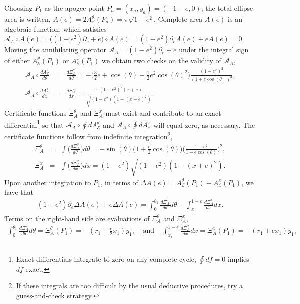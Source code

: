 \documentclass[nofootinbib,preprint]{revtex4-1}
\begin{document}
Choosing $P_1$ as the apogee point $P_a=(x_a,y_a)=(-1-e,0)$, the total ellipse area is written,
$A(e)=2A_{\mathcal{E}}^{\theta}(P_a)=\pi\sqrt{1-e^2}$. Complete area $A(e)$ is an algebraic function, which
 satisfies ${\mathcal{A}_A\circ A(e) =  \big((1-e^2)\partial_e + e\big)\circ A(e) = (1-e^2)\partial_e A(e) + e A(e)=0}$.
 Moving the  annihilating operator $\mathcal{A}_A =  (1-e^2)\partial_e + e$ under the integral sign of either 
$A_{\mathcal{E}}^{\theta}(P_1)$ or $A_{\mathcal{E}}^{x}(P_1)$ we obtain two checks on 
the validity of $\mathcal{A}_A$, 
\begin{eqnarray}
\mathcal{A}_A\circ \frac{dA_{\mathcal{E}}^{\theta}}{d\theta} &=&  \frac{d\Xi_{A}^{\theta}}{d\theta}
 = -\Big(\tfrac{3}{2}e+\cos(\theta)+\tfrac{1}{2}e^2\cos(\theta)^2\Big)\frac{(1-e^2)^2}{(1+e \cos(\theta))^3}, \nonumber \\
\mathcal{A}_A\circ \frac{dA_{\mathcal{E}}^{x}}{dx}   &=& \frac{d\Xi_{A}^{x}}{dx}
= \frac{-(1-e^2)^2(x+e)}{\sqrt{(1-e^2)(1-(x+e)^2)}} .\nonumber 
\end{eqnarray}
Certificate functions $\Xi_{A}^{\theta}$ and $\Xi_{A}^{x}$  must exist and contribute 
to an exact differential\footnote{Exact differentials integrate to zero on any complete cycle, 
$\oint df = 0$ implies $df$ exact.} so that $\mathcal{A}_A\circ \oint dA_{\mathcal{E}}^{\theta}$ 
and $\mathcal{A}_A\circ \oint dA_{\mathcal{E}}^{x}$ will equal zero, as necessary. The 
certificate functions follow from indefinite integration\footnote{If these integrals are too difficult
by the usual deductive procedures, try a guess-and-check strategy.},
\begin{eqnarray}
\Xi^{\theta}_A &=& \int \Big(\frac{d\Xi^{\theta}_A}{d\theta}\Big)d\theta
= -\sin(\theta)\big(1+\tfrac{e}{2}\cos(\theta)\big)\Big(\frac{1-e^2}{1+e\cos(\theta)}\Big)^2, \nonumber \\
\Xi^{x}_A &=& \int \Big(\frac{d\Xi^{x}_A}{dx}\Big)dx  
= (1-e^2)\sqrt{(1-e^2)(1-(x+e)^2)}. \nonumber 
\end{eqnarray}
Upon another integration to $P_1$, in terms of 
$\Delta A(e)=A^{\theta}_{\mathcal{E}}(P_1)-A^{x}_{\mathcal{E}}(P_1)$, 
we have that 
\begin{eqnarray}
(1-e^2)\partial_e \Delta A(e) + e \Delta A(e) = \int_{0}^{\theta_1}\frac{d\Xi^{\theta}_A}{d\theta} d\theta 
- \int_{x_1}^{1-e}\frac{d\Xi^{x}_A}{dx} dx. \nonumber
\end{eqnarray}
Terms on the right-hand side are evaluations of $\Xi^{\theta}_A$ and $\Xi^{x}_A$,
\begin{eqnarray}
\int_{0}^{\theta_1}\frac{d\Xi^{\theta}_A}{d\theta} d\theta
= \Xi^{\theta}_A(P_1) = -(r_1+\tfrac{e}{2}x_1)y_1, 
\;\;\;\; \text{and} \;\;\;\;
 \int_{x_1}^{1-e}\frac{d\Xi^{x}_A}{dx} dx
= \Xi^{x}_A(P_1)  =  - (r_1+ex_1)y_1,   \nonumber
\end{eqnarray}
\end{document}
